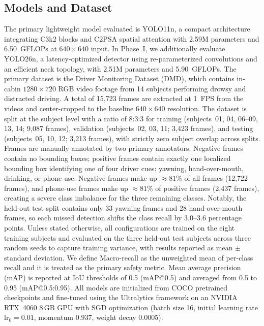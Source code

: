\documentclass[conference]{IEEEtran}
\begin{document}
\subsection{Models and Dataset}
The primary lightweight model evaluated is YOLO11n, a compact architecture integrating C3k2 blocks and C2PSA spatial attention with 2.59M parameters and 6.50~GFLOPs at $640\times640$ input. In Phase~I, we additionally evaluate YOLO26n, a latency-optimized detector using re-parameterized convolutions and an efficient neck topology, with 2.51M parameters and 5.90~GFLOPs. The primary dataset is the Driver Monitoring Dataset (DMD), which contains in-cabin $1280\times720$ RGB video footage from 14 subjects performing drowsy and distracted driving. A total of 15{,}723 frames are extracted at 1~FPS from the videos and center-cropped to the baseline $640\times640$ resolution. The dataset is split at the subject level with a ratio of 8:3:3 for training (subjects~01, 04, 06--09, 13, 14; 9{,}087 frames), validation (subjects~02, 03, 11; 3{,}423 frames), and testing (subjects~05, 10, 12; 3{,}213 frames), with strictly zero subject overlap across splits. Frames are manually annotated by two primary annotators. Negative frames contain no bounding boxes; positive frames contain exactly one localized bounding box identifying one of four driver cues: yawning, hand-over-mouth, drinking, or phone use. Negative frames make up $\approx81\%$ of all frames (12{,}722 frames), and phone-use frames make up $\approx81\%$ of positive frames (2{,}437 frames), creating a severe class imbalance for the three remaining classes. Notably, the held-out test split contains only 33 yawning frames and 28 hand-over-mouth frames, so each missed detection shifts the class recall by 3.0--3.6 percentage points. Unless stated otherwise, all configurations are trained on the eight training subjects and evaluated on the three held-out test subjects across three random seeds to capture training variance, with results reported as mean $\pm$ standard deviation. We define Macro-recall as the unweighted mean of per-class recall and it is treated as the primary safety metric. Mean average precision (mAP) is reported at IoU thresholds of 0.5 (mAP@0.5) and averaged from 0.5 to 0.95 (mAP@0.5:0.95). All models are initialized from COCO pretrained checkpoints and fine-tuned using the Ultralytics framework on an NVIDIA RTX~4060 8\,GB GPU with SGD optimization (batch size 16, initial learning rate $\text{lr}_0 = 0.01$, momentum 0.937, weight decay 0.0005).
\end{document}
